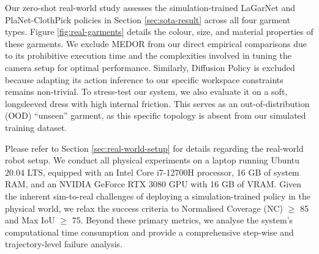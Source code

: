 \documentclass[journal]{IEEEtran}
\newcommand{\addinfo}[1]{\textcolor{myPurple}{#1}}
\newcommand{\addrealworld}[1]{\textcolor{brown!70!black}{#1}}
\begin{document}
\addrealworld{Our zero-shot real-world study assesses the simulation-trained LaGarNet and PlaNet-ClothPick policies in Section \ref{sec:sota-result}  across all four garment types. Figure \ref{fig:real-garments} details the colour, size, and material properties of these garments. We exclude MEDOR from our direct empirical comparisons due to its prohibitive execution time and the complexities involved in tuning the camera setup for optimal performance. Similarly, Diffusion Policy is excluded because adapting its action inference to our specific workspace constraints remains non-trivial. To stress-test our system, we also evaluate it on a soft, longsleeved dress with high internal friction. This serves as an out-of-distribution (OOD) ``unseen'' garment, as this specific topology is absent from our simulated training dataset.} 

\addinfo{Please refer to Section \ref{sec:real-world-setup} for details regarding the real-world robot setup. We conduct all physical experiments on a laptop running Ubuntu 20.04 LTS, equipped with an Intel Core i7-12700H processor, 16 GB of system RAM, and an NVIDIA GeForce RTX 3080 GPU with 16 GB of VRAM.} \addrealworld{Given the inherent sim-to-real challenges of deploying a simulation-trained policy in the physical world, we relax the success criteria to Normalised Coverage (NC) $\geq$ 85 and Max IoU $\geq$ 75. Beyond these primary metrics, we analyse the system's computational time consumption and provide a comprehensive step-wise and trajectory-level failure analysis.}
\end{document}
